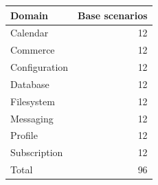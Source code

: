 \begin{tabular}{lr}
\toprule
Domain & Base scenarios \\
\midrule
Calendar & 12 \\
Commerce & 12 \\
Configuration & 12 \\
Database & 12 \\
Filesystem & 12 \\
Messaging & 12 \\
Profile & 12 \\
Subscription & 12 \\
\midrule
Total & 96 \\
\bottomrule
\end{tabular}
